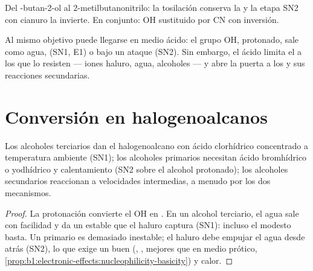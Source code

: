 \begin{omfigure}

{\small Del -butan-2-ol al 2-metilbutanonitrilo: la tosilación
conserva la  y la etapa SN2 con cianuro la invierte. En
conjunto: OH sustituido por CN con inversión.}
\end{omfigure}

Al mismo objetivo puede llegarse en medio ácido: el grupo OH, protonado,
sale como agua,  (SN1, E1) o bajo un ataque (SN2).
Sin embargo, el ácido limita el  a los que lo resisten ---
iones haluro, agua, alcoholes --- y abre la puerta a los  y
sus reacciones secundarias.

\section{Conversión en halogenoalcanos}

\begin{proposition}\label{prop:b1:alcohol-activation:hx-by-class}
Los alcoholes terciarios dan el halogenoalcano con ácido clorhídrico
concentrado a temperatura ambiente (SN1); los alcoholes primarios
necesitan ácido bromhídrico o yodhídrico y calentamiento (SN2 sobre el
alcohol protonado); los alcoholes secundarios reaccionan a velocidades
intermedias, a menudo por los dos mecanismos.
\end{proposition}

\begin{proof}
La protonación convierte el OH en . En un alcohol terciario, el
agua sale con facilidad y da un  estable que el haluro
captura (SN1): incluso el modesto   basta. Un
 primario es demasiado inestable; el haluro debe empujar el
agua desde atrás (SN2), lo que exige un buen  (,
, mejores que  en medio prótico,
\cref{prop:b1:electronic-effects:nucleophilicity-basicity}) y calor.
\end{proof}

